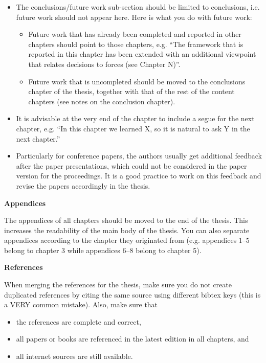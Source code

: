 \begin{itemize}
    \item The conclusions/future work sub-section should be limited
    to conclusions, i.e. future work should not appear here.
    Here is what you do with future work:
    \begin{itemize}
        \item Future work that has already been completed and reported
        in other chapters should point to those chapters, e.g.
        ``The framework that is reported in this chapter has been extended
        with an additional viewpoint that relates decisions to forces
        (see Chapter N)''.
        \item Future work that is uncompleted should be moved
        to the conclusions chapter of the thesis, together with
        that of the rest of the content chapters
        (see notes on the conclusion chapter).
    \end{itemize}
    
    \item It is advisable at the very end of the chapter to include a segue
    for the next chapter, e.g. ``In this chapter we learned X,
    so it is natural to ask Y in the next chapter.''
    
    \item Particularly for conference papers, the authors usually get
    additional feedback after the paper presentations,
    which could not be considered in the paper version for the proceedings.
    It is a good practice to work on this feedback and revise the papers
    accordingly in the thesis.
\end{itemize}

\noindent
\textbf{Appendices}

The appendices of all chapters should be moved to the end of the thesis.
This increases the readability of the main body of the thesis.
You can also separate appendices according to the chapter they originated from
(e.g. appendices 1--5 belong to chapter 3
while appendices 6--8 belong to chapter 5).

\vspace{0.5cm}
\noindent
\textbf{References}

When merging the references for the thesis,
make sure you do not create duplicated references
by citing the same source using different bibtex keys
(this is a VERY common mistake). Also, make sure that
\begin{itemize}
    \item the references are complete and correct,
    \item all papers or books are referenced in the latest edition
          in all chapters, and
    \item all internet sources are still available.
\end{itemize}
